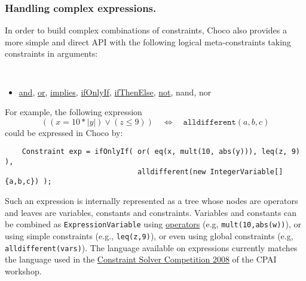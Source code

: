 \subsubsection{Handling complex expressions.}\label{model:handlingcomplexexpressions}\hypertarget{model:handlingcomplexexpressions}{}
In order to build complex combinations of constraints, Choco also provides a more simple and direct API with the following logical meta-constraints taking constraints in arguments:
\begin{notedef}\tt
  \begin{itemize}
  \item \hyperlink{and:andconstraint}{and}, \hyperlink{or:orconstraint}{or}, \hyperlink{implies:impliesconstraint}{implies}, \hyperlink{ifonlyif:ifonlyifconstraint}{ifOnlyIf}, \hyperlink{ifthenelse:ifthenelseconstraint}{ifThenElse}, \hyperlink{not:notconstraint}{not}, nand, nor
  \end{itemize}
\end{notedef}
For example, the following expression
$$((x = 10 * |y|) \lor (z \le 9))\quad \iff\quad \texttt{alldifferent}(a,b,c)$$
could be expressed in Choco by:
\begin{lstlisting}
	Constraint exp = ifOnlyIf( or( eq(x, mult(10, abs(y))), leq(z, 9) ), 
                               alldifferent(new IntegerVariable[]{a,b,c}) );
\end{lstlisting}
Such an expression is internally represented as a tree whose nodes are operators and leaves are variables, constants and constraints. Variables and constants can be combined as \texttt{ExpressionVariable} using \hyperlink{model:expressionvariables}{operators} (e.g, \texttt{mult(10,abs(w))}), or using simple constraints (e.g., \texttt{leq(z,9)}), or even using global constraints (e.g, \texttt{alldifferent(vars)}).
The language available on expressions currently matches the language used in the \href{http://cpai.ucc.ie/08/}{Constraint Solver Competition 2008} of the CPAI workshop.

